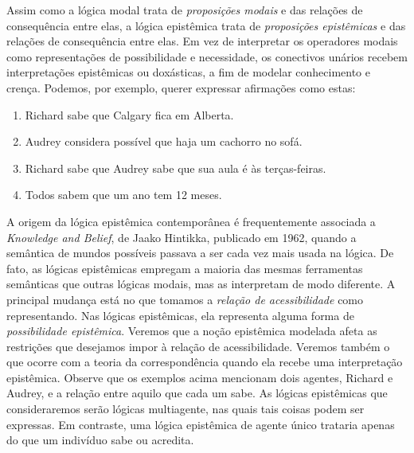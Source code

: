 \documentclass[../../../include/open-logic-section]{subfiles}
\begin{document}


Assim como a lógica modal trata de \emph{proposições modais} e das relações de consequência entre elas, a lógica epistêmica trata de \emph{proposições epistêmicas} e das relações de consequência entre elas. Em vez de interpretar os operadores modais como representações de possibilidade e necessidade, os conectivos unários recebem interpretações epistêmicas ou doxásticas, a fim de modelar conhecimento e crença. Podemos, por exemplo, querer expressar afirmações como estas:

\begin{enumerate}
\item Richard sabe que Calgary fica em Alberta.
\item Audrey considera possível que haja um cachorro no sofá.
\item Richard sabe que Audrey sabe que sua aula é às terças-feiras.
\item Todos sabem que um ano tem 12 meses.
\end{enumerate}
A origem da lógica epistêmica contemporânea é frequentemente associada a \emph{Knowledge and Belief}, de Jaako Hintikka, publicado em 1962, quando a semântica de mundos possíveis passava a ser cada vez mais usada na lógica. De fato, as lógicas epistêmicas empregam a maioria das mesmas ferramentas semânticas que outras lógicas modais, mas as interpretam de modo diferente. A principal mudança está no que tomamos a \emph{relação de acessibilidade} como representando. Nas lógicas epistêmicas, ela representa alguma forma de \emph{possibilidade epistêmica}. Veremos que a noção epistêmica modelada afeta as restrições que desejamos impor à relação de acessibilidade. Veremos também o que ocorre com a teoria da correspondência quando ela recebe uma interpretação epistêmica. Observe que os exemplos acima mencionam dois agentes, Richard e Audrey, e a relação entre aquilo que cada um sabe. As lógicas epistêmicas que consideraremos serão lógicas multiagente, nas quais tais coisas podem ser expressas. Em contraste, uma lógica epistêmica de agente único trataria apenas do que um indivíduo sabe ou acredita.
\end{document}
